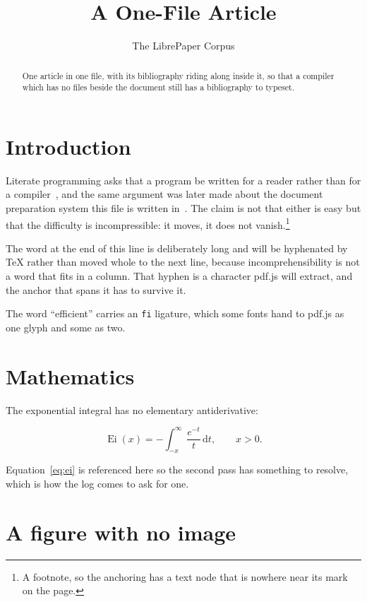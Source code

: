 \documentclass[11pt]{article}
\title{A One-File Article}
\author{The LibrePaper Corpus}
\date{}
\begin{document}
\maketitle

\begin{abstract}
  One article in one file, with its bibliography riding along inside it, so
  that a compiler which has no files beside the document still has a
  bibliography to typeset.
\end{abstract}

\section{Introduction}

Literate programming asks that a program be written for a reader rather than
for a compiler~\cite{knuth1984}, and the same argument was later made about
the document preparation system this file is written in~\cite{lamport1994}.
The claim is not that either is easy but that the difficulty is
incompressible: it moves, it does not vanish.\footnote{A footnote, so the
anchoring has a text node that is nowhere near its mark on the page.}

The word at the end of this line is deliberately long and will be
hyphenated by \TeX{} rather than moved whole to the next line, because
incomprehensibility is not a word that fits in a column. That hyphen is a
character pdf.js will extract, and the anchor that spans it has to survive it.

The word ``efficient'' carries an \texttt{fi} ligature, which some fonts hand
to pdf.js as one glyph and some as two.

\section{Mathematics}

The exponential integral has no elementary antiderivative:

\begin{equation}
  \label{eq:ei}
  \operatorname{Ei}(x) = -\int_{-x}^{\infty} \frac{e^{-t}}{t}\,\mathrm{d}t,
  \qquad x > 0 .
\end{equation}

Equation~\eqref{eq:ei} is referenced here so the second pass has something to
resolve, which is how the log comes to ask for one.

\section{A figure with no image}
\end{document}
